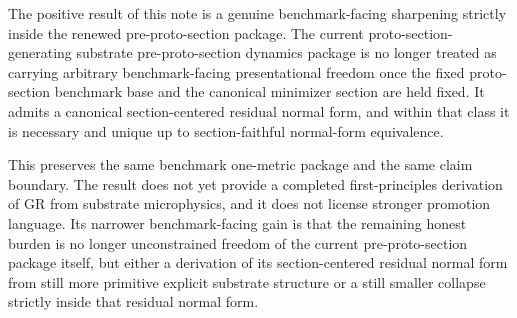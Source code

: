 \documentclass[11pt]{article}
\begin{document}
The positive result of this note is a genuine benchmark-facing sharpening strictly inside the renewed pre-proto-section package. The current proto-section-generating substrate pre-proto-section dynamics package is no longer treated as carrying arbitrary benchmark-facing presentational freedom once the fixed proto-section benchmark base and the canonical minimizer section are held fixed. It admits a canonical section-centered residual normal form, and within that class it is necessary and unique up to section-faithful normal-form equivalence.

This preserves the same benchmark one-metric package and the same claim boundary. The result does not yet provide a completed first-principles derivation of GR from substrate microphysics, and it does not license stronger promotion language. Its narrower benchmark-facing gain is that the remaining honest burden is no longer unconstrained freedom of the current pre-proto-section package itself, but either a derivation of its section-centered residual normal form from still more primitive explicit substrate structure or a still smaller collapse strictly inside that residual normal form.
\end{document}
